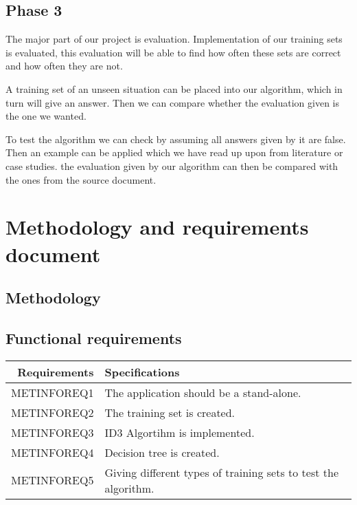 \documentclass{article}
\begin{document}
\subsection{Phase 3}
\label{sec:phase}

The major part of our project is evaluation. Implementation of our training sets is evaluated, this evaluation will be able to find how often these sets are correct and how often they are not.  

A training set of an unseen situation can be placed into our algorithm, which in turn will give an answer. Then we can compare whether the evaluation given is the one we wanted.

To test the algorithm we can check by assuming all answers given by it are false. Then an example can be applied which we have read up upon from literature or case studies. the evaluation given by our algorithm can then be compared with the ones from the source document.

\pagebreak

\section{Methodology and requirements document}
\label{sec:methrecdoc}

\subsection{Methodology}
\label{sec:meth}


\subsection{Functional requirements}

\begin{center}
\begin{tabular}{|r|l|}

\hline
Requirements & Specifications\\[5pt]
\hline

METINFOREQ1 &
The application should be a stand-alone. 
\\\hline

METINFOREQ2 &
The training set is created.
\\\hline

METINFOREQ3&
ID3 Algortihm is implemented. 
\\\hline

METINFOREQ4&
Decision tree is created. 
\\\hline

METINFOREQ5&
Giving different types of training sets to test the algorithm.
\\\hline

\end{tabular}
\end{center}
\end{document}
